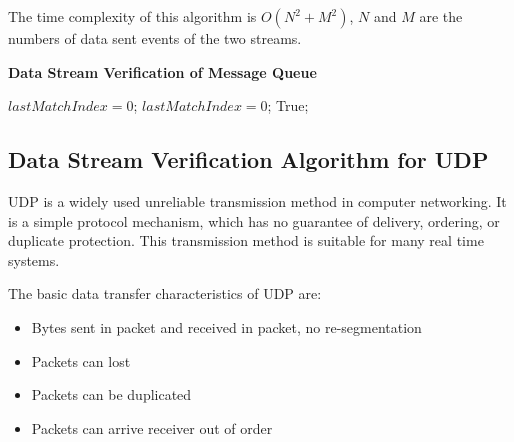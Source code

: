 The time complexity of this algorithm is $O(N^2+M^2)$, $N$ and $M$ are the numbers of data sent events of the two streams.

\begin{algorithm}[H]
\DontPrintSemicolon
\caption{{\bf Data Stream Verification of Message Queue } \label{dataAlg3}}
\;
$lastMatchIndex = 0$;\;
$lastMatchIndex = 0$;\;
 \KwRet True;\;
\end{algorithm} 

\subsection{Data Stream Verification Algorithm for UDP}
UDP is a widely used unreliable transmission method in computer networking. It is a simple protocol mechanism, which has no guarantee of delivery, ordering, or duplicate protection. This transmission method is suitable for many real time systems. 

The basic data transfer characteristics of UDP are:
\begin{itemize}
  \item Bytes sent in packet and received in packet, no re-segmentation
  \item Packets can lost
  \item Packets can be duplicated
  \item Packets can arrive receiver out of order
\end{itemize}

